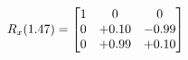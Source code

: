 \documentclass[preview]{standalone}
\begin{document}
\begin{align*}
\special{dvisvgm:raw <g id='unique000'>}R_{x}(1.47) = \begin{bmatrix}1 & 0 & 0 \\0 & +0.10 & -0.99 \\0 & +0.99 & +0.10\end{bmatrix}\special{dvisvgm:raw </g>}
\end{align*}
\end{document}
